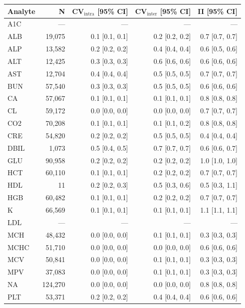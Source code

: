 \begin{table}[ht]
\centering
\footnotesize
\begin{tabular}{lrrrr}
\toprule
Analyte & N & CV$_{\text{intra}}$ [95\% CI] & CV$_{\text{inter}}$ [95\% CI] & II [95\% CI] \\
\midrule
A1C & --- & --- & --- & --- \\
ALB & 19,075 & 0.1 [0.1, 0.1] & 0.2 [0.2, 0.2] & 0.7 [0.7, 0.7] \\
ALP & 13,582 & 0.2 [0.2, 0.2] & 0.4 [0.4, 0.4] & 0.6 [0.5, 0.6] \\
ALT & 12,425 & 0.3 [0.3, 0.3] & 0.6 [0.6, 0.6] & 0.6 [0.6, 0.6] \\
AST & 12,704 & 0.4 [0.4, 0.4] & 0.5 [0.5, 0.5] & 0.7 [0.7, 0.7] \\
BUN & 57,540 & 0.3 [0.3, 0.3] & 0.5 [0.5, 0.5] & 0.6 [0.6, 0.6] \\
CA & 57,067 & 0.1 [0.1, 0.1] & 0.1 [0.1, 0.1] & 0.8 [0.8, 0.8] \\
CL & 59,172 & 0.0 [0.0, 0.0] & 0.0 [0.0, 0.0] & 0.7 [0.7, 0.7] \\
CO2 & 70,208 & 0.1 [0.1, 0.1] & 0.1 [0.1, 0.2] & 0.8 [0.8, 0.8] \\
CRE & 54,820 & 0.2 [0.2, 0.2] & 0.5 [0.5, 0.5] & 0.4 [0.4, 0.4] \\
DBIL & 1,073 & 0.5 [0.4, 0.5] & 0.7 [0.7, 0.7] & 0.6 [0.6, 0.7] \\
GLU & 90,958 & 0.2 [0.2, 0.2] & 0.2 [0.2, 0.2] & 1.0 [1.0, 1.0] \\
HCT & 60,110 & 0.1 [0.1, 0.1] & 0.2 [0.2, 0.2] & 0.7 [0.7, 0.7] \\
HDL & 11 & 0.2 [0.2, 0.3] & 0.5 [0.3, 0.6] & 0.5 [0.3, 1.1] \\
HGB & 60,482 & 0.1 [0.1, 0.1] & 0.2 [0.2, 0.2] & 0.7 [0.7, 0.7] \\
K & 66,569 & 0.1 [0.1, 0.1] & 0.1 [0.1, 0.1] & 1.1 [1.1, 1.1] \\
LDL & --- & --- & --- & --- \\
MCH & 48,432 & 0.0 [0.0, 0.0] & 0.1 [0.1, 0.1] & 0.3 [0.3, 0.3] \\
MCHC & 51,710 & 0.0 [0.0, 0.0] & 0.0 [0.0, 0.0] & 0.6 [0.6, 0.6] \\
MCV & 50,841 & 0.0 [0.0, 0.0] & 0.1 [0.1, 0.1] & 0.3 [0.3, 0.3] \\
MPV & 37,083 & 0.0 [0.0, 0.0] & 0.1 [0.1, 0.1] & 0.3 [0.3, 0.3] \\
NA & 124,270 & 0.0 [0.0, 0.0] & 0.0 [0.0, 0.0] & 0.8 [0.8, 0.8] \\
PLT & 53,371 & 0.2 [0.2, 0.2] & 0.4 [0.4, 0.4] & 0.6 [0.6, 0.6] \\

\end{tabular}
\end{table}
